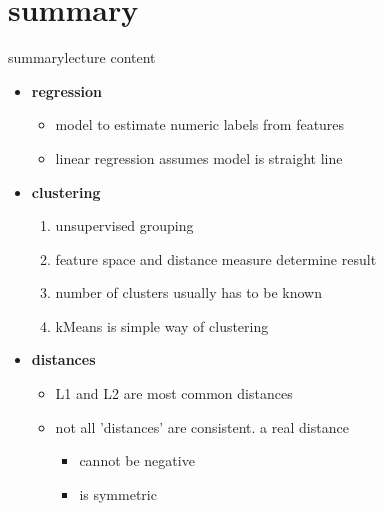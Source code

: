     \section{summary}
        \begin{frame}{summary}{lecture content}
            \begin{itemize}
                \item   \textbf{regression}
                    \begin{itemize}
                        \item   model to estimate numeric labels from features
                        \item   linear regression assumes model is straight line
                    \end{itemize}
                \bigskip
                \item   \textbf{clustering}
                    \begin{enumerate}
                        \item   unsupervised grouping
                        \item   feature space and distance measure determine result
                        \item   number of clusters usually has to be known
                        \item   kMeans is simple way of clustering
                    \end{enumerate}
                \bigskip
                \item   \textbf{distances}
                    \begin{itemize}
                        \item   L1 and L2 are most common distances
                        \item   not all 'distances' are consistent. a real distance
                        \begin{itemize}
                            \item   cannot be negative
                            \item   is symmetric
                        \end{itemize}
                    \end{itemize}
            \end{itemize}
        \end{frame}

